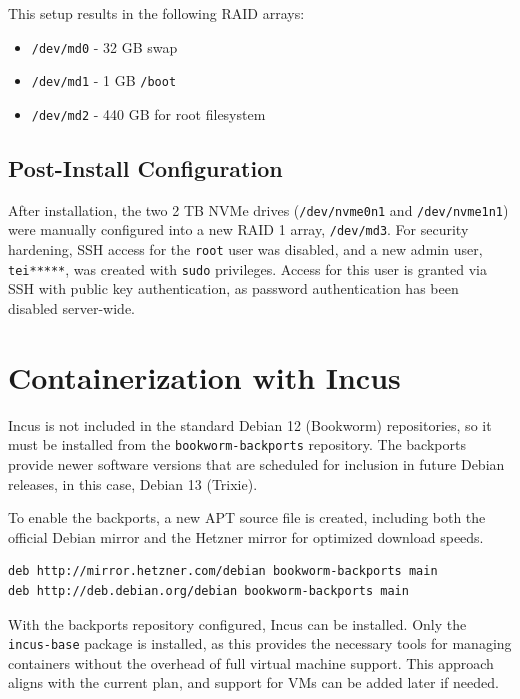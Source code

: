 This setup results in the following RAID arrays:

\begin{itemize}
  \item \texttt{/dev/md0} - 32 GB swap
  \item \texttt{/dev/md1} - 1 GB \texttt{/boot}
  \item \texttt{/dev/md2} - 440 GB for root filesystem
\end{itemize}

\subsection*{Post-Install Configuration}

After installation, the two 2 TB NVMe drives (\texttt{/dev/nvme0n1} and \texttt{/dev/nvme1n1}) were manually configured into a new RAID 1 array, \texttt{/dev/md3}. For security hardening, SSH access for the \texttt{root} user was disabled, and a new admin user, \texttt{tei*****}, was created with \texttt{sudo} privileges. Access for this user is granted via SSH with public key authentication, as password authentication has been disabled server-wide.

\section{Containerization with Incus}

Incus is not included in the standard Debian 12 (Bookworm) repositories, so it must be installed from the \texttt{bookworm-backports} repository. The backports provide newer software versions that are scheduled for inclusion in future Debian releases, in this case, Debian 13 (Trixie).

To enable the backports, a new APT source file is created, including both the official Debian mirror and the Hetzner mirror for optimized download speeds.

\begin{lstlisting}[language=bash,caption={APT sources list enabling the bookworm-backports repository}]
deb http://mirror.hetzner.com/debian bookworm-backports main
deb http://deb.debian.org/debian bookworm-backports main
\end{lstlisting}

With the backports repository configured, Incus can be installed. Only the \texttt{incus-base} package is installed, as this provides the necessary tools for managing containers without the overhead of full virtual machine support. This approach aligns with the current plan, and support for VMs can be added later if needed.

